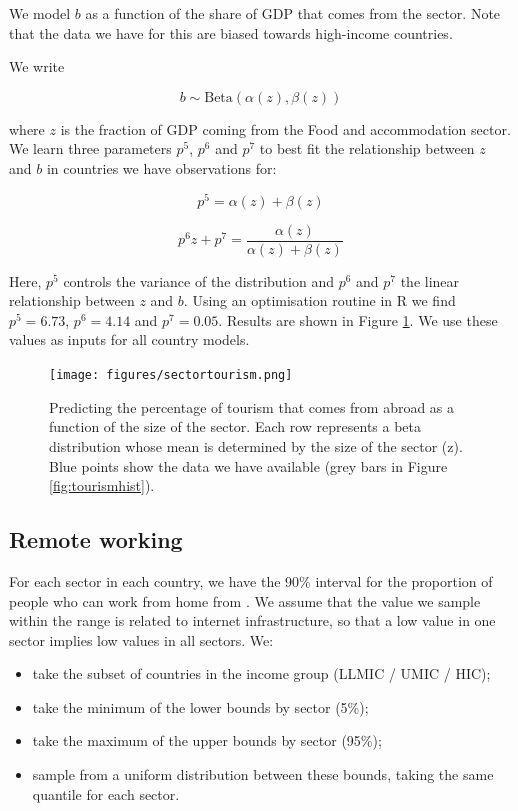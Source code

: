 \documentclass[
]{article}
\providecommand{\tightlist}{%
  \setlength{\itemsep}{0pt}\setlength{\parskip}{0pt}}
\begin{document}
We model \(b\) as a function of the share of GDP that comes from the sector. Note that the data we have for this are biased towards high-income countries.

We write

\[b\sim\text{Beta}(\alpha(z),\beta(z))\]

where \(z\) is the fraction of GDP coming from the Food and accommodation sector. We learn three parameters \(p^5\), \(p^6\) and \(p^7\) to best fit the relationship between \(z\) and \(b\) in countries we have observations for:

\[p^5 = \alpha(z)+\beta(z)\]

\[p^6 z + p^7 = \frac{\alpha(z)}{\alpha(z)+\beta(z)}\]

Here, \(p^5\) controls the variance of the distribution and \(p^6\) and \(p^7\) the linear relationship between \(z\) and \(b\). Using an optimisation routine in R we find \(p^5=6.73\),
\(p^6=4.14\) and \(p^7=0.05\). Results are shown in Figure \ref{fig:sectortourism}. We use these values as inputs for all country models.

\begin{figure}
\centering
\texttt{[image: figures/sectortourism.png]}
\caption{\label{fig:sectortourism} Predicting the percentage of tourism that comes from abroad as a function of the size of the sector. Each row represents a beta distribution whose mean is determined by the size of the sector (z). Blue points show the data we have available (grey bars in Figure \ref{fig:tourismhist}).}
\end{figure}

\newpage

\subsection{Remote working}\label{remote-working}

For each sector in each country, we have the 90\% interval for the proportion of people who can work from home from \citet{Gottlieb2021}. We assume that the value we sample within the range is related to internet infrastructure, so that a low value in one sector implies low values in all sectors. We:

\begin{itemize}
\tightlist
\item
  take the subset of countries in the income group (LLMIC / UMIC / HIC);
\item
  take the minimum of the lower bounds by sector (5\%);
\item
  take the maximum of the upper bounds by sector (95\%);
\item
  sample from a uniform distribution between these bounds, taking the same quantile for each sector.
\end{itemize}
\end{document}
